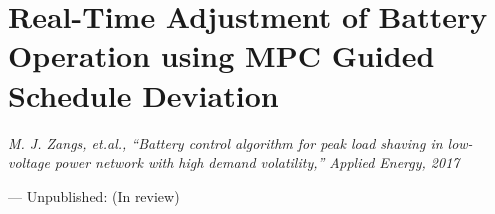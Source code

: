 \chapter{Real-Time Adjustment of Battery Operation using MPC Guided Schedule Deviation}
\label{ch2}

\singlespacing
\epigraph{\textit{M. J. Zangs, et.al., ``Battery control algorithm for peak load shaving in low-voltage power network with high demand volatility,'' Applied Energy, 2017}}{--- Unpublished: (In review)}
\doublespacing












